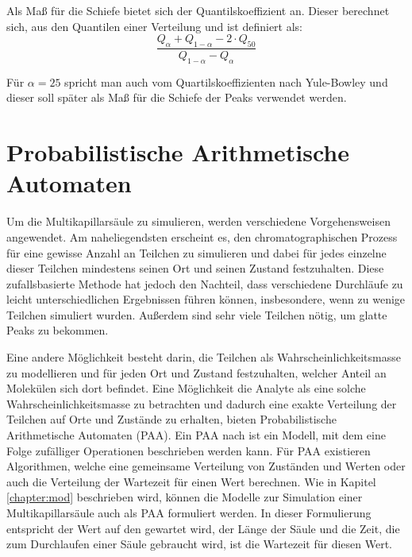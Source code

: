 Als Maß für die Schiefe bietet sich der Quantilskoeffizient \citep{johnson1994} an.
Dieser berechnet sich, aus den Quantilen einer Verteilung und ist definiert als: 
\begin{equation}
\frac{Q_{\alpha} + Q_{1-\alpha} -2\cdot Q_{50} }{ Q_{1-\alpha} - Q_{\alpha}}
\end{equation}

Für $\alpha = 25$ spricht man auch vom Quartilskoeffizienten nach Yule-Bowley und dieser soll später als Maß für die Schiefe der Peaks verwendet werden.


\section{Probabilistische Arithmetische Automaten}
Um die Multikapillarsäule zu simulieren, werden verschiedene Vorgehensweisen angewendet. Am naheliegendsten erscheint es, den chromatographischen Prozess für eine gewisse Anzahl an Teilchen zu simulieren und dabei für jedes einzelne dieser Teilchen mindestens seinen Ort und seinen Zustand festzuhalten. Diese zufallsbasierte Methode hat jedoch den Nachteil, dass verschiedene Durchläufe zu leicht unterschiedlichen Ergebnissen führen können, insbesondere, wenn zu wenige Teilchen simuliert wurden.
Außerdem sind sehr viele Teilchen nötig, um glatte Peaks zu bekommen.

Eine andere Möglichkeit besteht darin, die Teilchen als Wahrscheinlichkeitsmasse zu modellieren und für jeden Ort und Zustand festzuhalten, welcher Anteil an Molekülen sich dort befindet.
Eine Möglichkeit die Analyte als eine solche Wahrscheinlichkeitsmasse zu betrachten und dadurch eine exakte Verteilung der Teilchen auf Orte und Zustände zu erhalten, bieten Probabilistische Arithmetische Automaten (PAA).
Ein PAA nach \cite{MHKR} ist ein Modell, mit dem eine Folge zufälliger Operationen beschrieben werden kann. 
Für PAA existieren Algorithmen, welche eine gemeinsame Verteilung von Zuständen und Werten oder auch die Verteilung der Wartezeit für einen Wert berechnen. Wie in Kapitel \ref{chapter:mod} beschrieben wird, können die Modelle zur Simulation einer Multikapillarsäule auch als PAA formuliert werden. 
In dieser Formulierung entspricht der Wert auf den gewartet wird, der Länge der Säule und die Zeit, die zum Durchlaufen einer Säule gebraucht wird, ist die Wartezeit für diesen Wert. %

